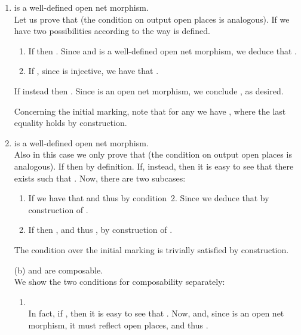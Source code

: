 \documentclass{LMCS}
\begin{document}
  \begin{enumerate}[({a}.1)]

  \item  is a well-defined open net morphism.\\
    Let us prove that 
    (the condition on  output open places is analogous).  If  we have two possibilities according to the way
     is defined.
    \begin{enumerate}[]
    \item If  then . Since  and  is a well-defined open net morphism, we
    deduce that .

    \item If , since  is injective, we have that
    .
    \end{enumerate}
    If instead  then . Since  is an open net morphism, we conclude , as desired.

    Concerning the initial marking, note that for any  we
    have , where the last equality holds by construction.

    \medskip
    
  \item  is a well-defined open net morphism.\\
    Also in this case we only prove that  (the condition on  output open places is
    analogous). If  then  by
    definition. If, instead,  then it is easy to see
    that there exists  such that . Now, there are two subcases:
    \begin{enumerate}[]
      
    \item If  we have that  and
      thus  by
      condition~2. Since  we deduce that  by construction of .

    \item If  then , and
      thus , by construction of .
      
    \end{enumerate}
    The condition over the initial marking is trivially satisfied by
    construction.

    \medskip

  \item[(b)]  and  are composable.\\
    We show the two conditions for composability separately:
    \begin{enumerate}[]

    \item \\
      In fact, if , then it is easy to see that .  Now,  and, since  is an
      open net morphism, it must reflect open places, and thus .
  

\end{enumerate}
\end{enumerate}
\end{document}
